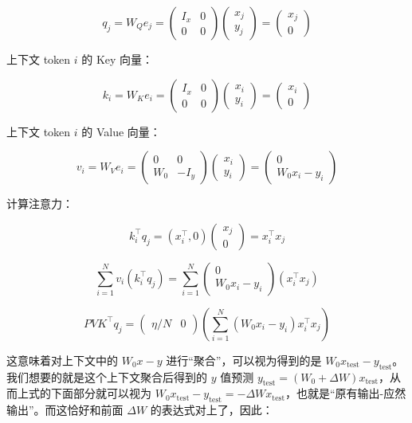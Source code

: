 \[
q_j=W_Q e_j=\begin{pmatrix}I_x&0\\0&0\end{pmatrix}\begin{pmatrix}x_j\\y_j\end{pmatrix}=\begin{pmatrix}x_j\\0\end{pmatrix}
\]

上下文 token \(i\) 的 Key 向量：

\[
k_i=W_K e_i=\begin{pmatrix}I_x&0\\0&0\end{pmatrix}\begin{pmatrix}x_i\\y_i\end{pmatrix}=\begin{pmatrix}x_i\\0\end{pmatrix}
\]

上下文 token \(i\) 的 Value 向量：

\[
v_i=W_V e_i=\begin{pmatrix}0&0\\W_0&-I_y\end{pmatrix}\begin{pmatrix}x_i\\y_i\end{pmatrix}=\begin{pmatrix}0\\W_0x_i-y_i\end{pmatrix}
\]

计算注意力：

\[
k_i^\top q_j=(x_i^\top,0)\begin{pmatrix}x_j\\0\end{pmatrix}=x_i^\top x_j
\]

\[
\sum_{i=1}^{N}v_i(k_i^\top q_j)=\sum_{i=1}^{N}\begin{pmatrix}0\\W_0x_i-y_i\end{pmatrix}(x_i^\top x_j)
\]

\[
PVK^\top q_j=\begin{pmatrix}\eta/N&0\end{pmatrix}\left(\sum_{i=1}^{N}(W_0x_i-y_i)x_i^\top x_j\right)
\]

这意味着对上下文中的 \(W_0x-y\) 进行``聚合''，可以视为得到的是 \(W_0x_{\mathrm{test}}-y_{\mathrm{test}}\)。我们想要的就是这个上下文聚合后得到的 \(y\) 值预测 \(y_{\mathrm{test}}=(W_0+\Delta W)x_{\mathrm{test}}\)，从而上式的下面部分就可以视为 \(W_0x_{\mathrm{test}}-y_{\mathrm{test}}=-\Delta W x_{\mathrm{test}}\)，也就是``原有输出-应然输出''。而这恰好和前面 \(\Delta W\) 的表达式对上了，因此：


